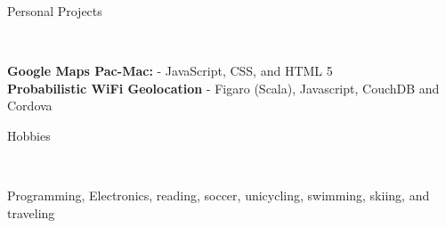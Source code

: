 \documentclass[9pt]{article}
\newenvironment{changemargin}[2]{%
  \begin{list}{}{%
    \setlength{\topsep}{0pt}%
    \setlength{\leftmargin}{#1}%
    \setlength{\rightmargin}{#2}%
    \setlength{\listparindent}{\parindent}%
    \setlength{\itemindent}{\parindent}%
    \setlength{\parsep}{\parskip}%
  }%
  \item[]}{\end{list}
}
\newcommand{\lineover}{
    \begin{changemargin}{-0.05in}{-0.05in}
        \vspace*{-8pt}
        \hrulefill \\
        \vspace*{-2pt}
    \end{changemargin}
}
\newcommand{\header}[1]{
    \begin{changemargin}{-0.5in}{-0.5in}
        {\large #1}\\
        \lineover
    \end{changemargin}
}
\newenvironment{body} {
    \vspace*{-16pt}
    \begin{changemargin}{-0.20in}{-0.5in}
  }
    {\end{changemargin}
}
\begin{document}

\header{Personal Projects}

\begin{body}
    \vspace{14pt}

    \textbf{Google Maps Pac-Mac:} - JavaScript, CSS, and HTML 5\\
    \medskip
    \textbf{Probabilistic WiFi Geolocation} - Figaro (Scala), Javascript, CouchDB and Cordova \\

\end{body}
\smallskip


\header{Hobbies}

\begin{body}
    \vspace{14pt}
    Programming, Electronics, reading, soccer, unicycling, swimming, skiing, and traveling
\end{body}
\end{document}
